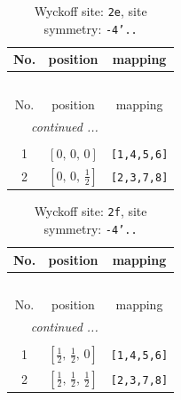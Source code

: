 \documentclass[fleqn,8pt]{jsarticle}
\begin{document}
\begin{longtable}{ccc}
\caption{Wyckoff site: {\tt 2e}, site symmetry: {\tt -4'..}}
 \\
 \hline \hline
No. & position & mapping \\ \hline \endfirsthead

\multicolumn{2}{l}{\tablename\ \thetable{}} \\
 \hline \hline
No. & position & mapping \\ \hline \endhead

 \hline \hline
\multicolumn{2}{r}{\footnotesize\it continued ...} \\ \endfoot

 \hline \hline
\multicolumn{2}{r}{} \\ \endlastfoot

1 & $\left[ 0,\, 0,\, 0 \right]$ & {\tt [1,4,5,6]} \\ \hline
2 & $\left[ 0,\, 0,\, \frac{1}{2} \right]$ & {\tt [2,3,7,8]} \\
\end{longtable}
\renewcommand{\arraystretch}{1.2}
\begin{longtable}{ccc}
\caption{Wyckoff site: {\tt 2f}, site symmetry: {\tt -4'..}}
 \\
 \hline \hline
No. & position & mapping \\ \hline \endfirsthead

\multicolumn{2}{l}{\tablename\ \thetable{}} \\
 \hline \hline
No. & position & mapping \\ \hline \endhead

 \hline \hline
\multicolumn{2}{r}{\footnotesize\it continued ...} \\ \endfoot

 \hline \hline
\multicolumn{2}{r}{} \\ \endlastfoot

1 & $\left[ \frac{1}{2},\, \frac{1}{2},\, 0 \right]$ & {\tt [1,4,5,6]} \\ \hline
2 & $\left[ \frac{1}{2},\, \frac{1}{2},\, \frac{1}{2} \right]$ & {\tt [2,3,7,8]} \\
\end{longtable}
\renewcommand{\arraystretch}{1.2}
\end{document}
